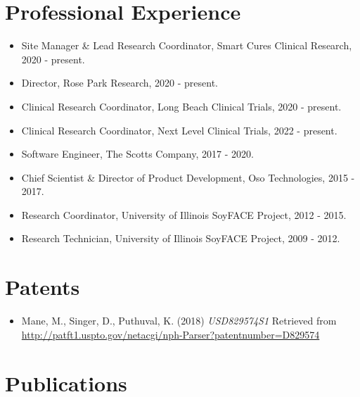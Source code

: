 \documentclass[letterpaper]{article}
\begin{document}
\section*{Professional Experience}

  \begin{itemize}
    \item Site Manager \& Lead Research Coordinator, Smart Cures Clinical Research, 2020 - present.
    \item Director, Rose Park Research, 2020 - present.
    \item Clinical Research Coordinator, Long Beach Clinical Trials, 2020 - present.
    \item Clinical Research Coordinator, Next Level Clinical Trials, 2022 - present.
    \item Software Engineer, The Scotts Company, 2017 - 2020.
    \item Chief Scientist \& Director of Product Development, Oso Technologies, 2015 - 2017.
    \item Research Coordinator, University of Illinois SoyFACE Project, 2012 - 2015.
    \item Research Technician, University of Illinois SoyFACE Project, 2009 - 2012.
  \end{itemize}

\section*{Patents}

  \begin{itemize}
    \item Mane, M., Singer, D., Puthuval, K. (2018) {\it USD829574S1} Retrieved from \href{http://patft1.uspto.gov/netacgi/nph-Parser?patentnumber=D829574}{http://patft1.uspto.gov/netacgi/nph-Parser?patentnumber=D829574}
  \end{itemize}

\section*{Publications}
\end{document}
